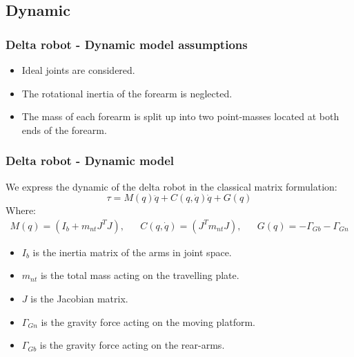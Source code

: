\subsection{Dynamic}
\begin{frame}
\frametitle{Delta robot - Dynamic model assumptions}
\begin{itemize}
	\item Ideal joints are considered.
	\item The rotational inertia of the forearm is neglected.
	\item The mass of each forearm is split up into two point-masses located at both ends of the forearm.
\end{itemize}
\end{frame}
%
\begin{frame}
\frametitle{Delta robot - Dynamic model}
We express the dynamic of the delta robot in the classical matrix formulation:
\begin{equation}
	\tau = M(q)\ddot{q} + C(q,\dot{q})\dot{q} + G(q)
\end{equation}
Where:
\begin{align}
	M(q) = \left(I_b + m_{nt}J^TJ\right), && C(q,\dot{q}) = \left(J^Tm_{nt}J\right), && G(q) = -\Gamma_{Gb} - \Gamma_{Gn}
\end{align}
\begin{itemize}
	\item $I_b$ is the inertia matrix of the arms in joint space.
	\item $m_{nt}$ is the total mass acting on the travelling plate.
	\item $J$ is the Jacobian matrix.
	\item $\Gamma_{Gn}$ is the gravity force acting on the moving platform.
	\item $\Gamma_{Gb}$ is the gravity force acting on the rear-arms.
\end{itemize}
\end{frame}
%
